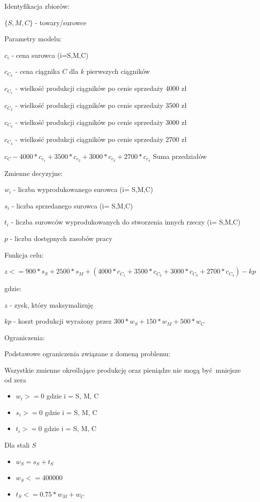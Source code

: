 \documentclass{article}
\begin{document}
\noindent
Identyfikacja zbiorów: 

$\{ S, M ,C \}$ - towary/surowce

\noindent
Parametry modelu:

$c_i$ - cena surowca (i=S,M,C)

$c_C_k$ - cena ciągnika $C$ dla $k$ pierwszych ciągników

$c_C_1$ - wielkość produkcji ciągników po cenie sprzedaży 4000 zł

$c_C_2$ - wielkość produkcji ciągników po cenie sprzedaży 3500 zł

$c_C_3$ - wielkość produkcji ciągników po cenie sprzedaży 3000 zł

$c_C_4$ - wielkość produkcji ciągników po cenie sprzedaży 2700 zł

$c_C - 4000 * c_c_1 + 3500 * c_c_2 + 3000 * c_c_3 + 2700 * c_c_4$ Suma przedziałów

\noindent
Zmienne decyzyjne:

$w_i$ - liczba wyprodukowanego surowca (i= S,M,C)

$s_i$ - liczba sprzedanego surowca (i= S,M,C)

$t_i$ - liczba surowców wyprodukowanych do stworzenia innych rzeczy (i= S,M,C)

$p$ - liczba dostępnych zasobów pracy

\noindent
Funkcja celu:

$z <= 900 * s_S + 2500 * s_M + (4000 * c_C_1 + 3500 * c_C_2 + 3000 * c_C_3 + 2700 * c_C_4) - kp$

gdzie:

$z$ - zysk, który maksymalizuję

$kp$ - koszt produkcji wyrażony przez $300 * w_S + 150 * w_M + 500 * w_C$

\noindent
Ograniczenia:

Podstawowe ograniczenia związane z domeną problemu:

Wszystkie zmienne określające produkcję oraz pieniądze nie mogą być mniejsze od zera

\begin{itemize}
  \item $w_i >= 0$ gdzie i = S, M, C
  \item $s_i >= 0$ gdzie i = S, M, C
  \item $t_i >= 0$ gdzie i = S, M, C
\end{itemize}

Dla stali $S$

\begin{itemize}
  \item $w_S = s_S + t_S$
  \item $w_S <= 400000$
  \item $t_S <= 0.75 * w_M + w_C$
\end{itemize}
\end{document}
